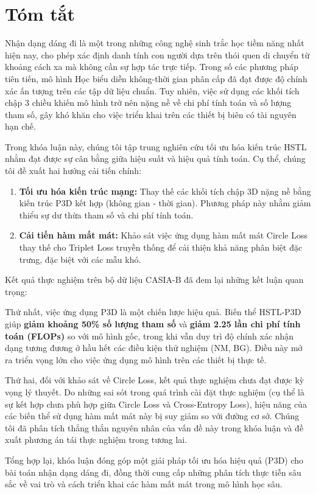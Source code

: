 \chapter*{Tóm tắt}

Nhận dạng dáng đi là một trong những công nghệ sinh trắc học tiềm năng nhất hiện nay, cho phép xác định danh tính con người dựa trên thói quen di chuyển từ khoảng cách xa mà không cần sự hợp tác trực tiếp. Trong số các phương pháp tiên tiến, mô hình Học biểu diễn không-thời gian phân cấp  đã đạt được độ chính xác ấn tượng trên các tập dữ liệu chuẩn. Tuy nhiên, việc sử dụng các khối tích chập 3 chiều khiến mô hình trở nên nặng nề về chi phí tính toán và số lượng tham số, gây khó khăn cho việc triển khai trên các thiết bị biên có tài nguyên hạn chế.

Trong khóa luận này, chúng tôi tập trung nghiên cứu tối ưu hóa kiến trúc HSTL nhằm đạt được sự cân bằng giữa hiệu suất và hiệu quả tính toán. Cụ thể, chúng tôi đề xuất hai hướng cải tiến chính:

\begin{enumerate}
    \item \textbf{Tối ưu hóa kiến trúc mạng:} Thay thế các khối tích chập 3D nặng nề bằng kiến trúc P3D kết hợp (không gian - thời gian). Phương pháp này nhằm giảm thiểu sự dư thừa tham số và chi phí tính toán.
    \item \textbf{Cải tiến hàm mất mát:} Khảo sát việc ứng dụng hàm mất mát Circle Loss thay thế cho Triplet Loss truyền thống để cải thiện khả năng phân biệt đặc trưng, đặc biệt với các mẫu khó.
\end{enumerate}

Kết quả thực nghiệm trên bộ dữ liệu CASIA-B đã đem lại những kết luận quan trọng:

Thứ nhất, việc ứng dụng P3D là một chiến lược hiệu quả. Biến thể HSTL-P3D giúp \textbf{giảm khoảng 50\% số lượng tham số} và \textbf{giảm 2.25 lần chi phí tính toán (FLOPs)} so với mô hình gốc, trong khi vẫn duy trì độ chính xác nhận dạng tương đương ở hầu hết các điều kiện thử nghiệm (NM, BG). Điều này mở ra triển vọng lớn cho việc ứng dụng mô hình trên các thiết bị thực tế.

Thứ hai, đối với khảo sát về Circle Loss, kết quả thực nghiệm chưa đạt được kỳ vọng lý thuyết. Do những sai sót trong quá trình cài đặt thực nghiệm (cụ thể là sự kết hợp chưa phù hợp giữa Circle Loss và Cross-Entropy Loss), hiệu năng của các biến thể sử dụng hàm mất mát này bị suy giảm so với đường cơ sở. Chúng tôi đã phân tích thẳng thắn nguyên nhân của vấn đề này trong khóa luận và đề xuất phương án tái thực nghiệm trong tương lai.

Tổng hợp lại, khóa luận đóng góp một giải pháp tối ưu hóa hiệu quả (P3D) cho bài toán nhận dạng dáng đi, đồng thời cung cấp những phân tích thực tiễn sâu sắc về vai trò và cách triển khai các hàm mất mát trong mô hình học sâu.

